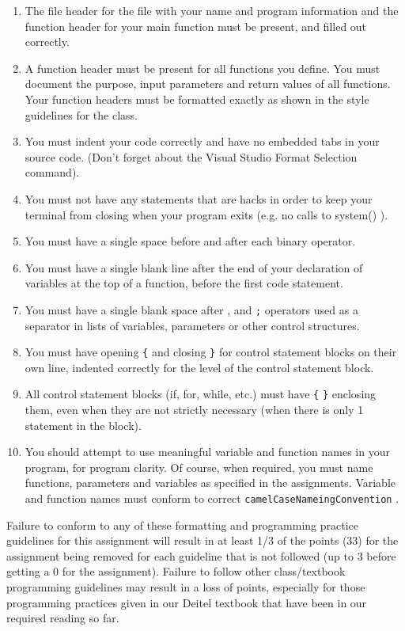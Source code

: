 \documentclass[11pt]{article}
\begin{document}
\begin{enumerate}
\item The file header for the file with your name and program information
  and the function header for your main function must be present, and
  filled out correctly.
\item A function header must be present for all functions you define.
   You must document the purpose, input parameters and return values
   of all functions.  Your function headers must be formatted exactly
   as shown in the style guidelines for the class.
\item You must indent your code correctly and have no embedded tabs in
  your source code. (Don't forget about the Visual Studio Format
  Selection command).
\item You must not have any statements that are hacks in order to keep
   your terminal from closing when your program exits (e.g. no calls
   to system() ).
\item You must have a single space before and after each binary operator.
\item You must have a single blank line after the end of your declaration
  of variables at the top of a function, before the first code
  statement.
\item You must have a single blank space after , and \verb~;~ operators used as a
  separator in lists of variables, parameters or other control
  structures.
\item You must have opening \verb~{~ and closing \verb~}~ for control statement blocks
  on their own line, indented correctly for the level of the control
  statement block.
\item All control statement blocks (if, for, while, etc.) must have \verb~{~
   \verb~}~ enclosing them, even when they are not strictly necessary
   (when there is only 1 statement in the block).
\item You should attempt to use meaningful variable and function names in
   your program, for program clarity.  Of course, when required, you
   must name functions, parameters and variables as specified in the
   assignments.  Variable and function names must conform to correct
   \verb~camelCaseNameingConvention~ .
\end{enumerate}

Failure to conform to any of these formatting and programming practice
guidelines for this assignment will result in at least 1/3 of the
points (33) for the assignment being removed for each guideline that
is not followed (up to 3 before getting a 0 for the
assignment). Failure to follow other class/textbook programming
guidelines may result in a loss of points, especially for those
programming practices given in our Deitel textbook that have been in
our required reading so far.
\end{document}
